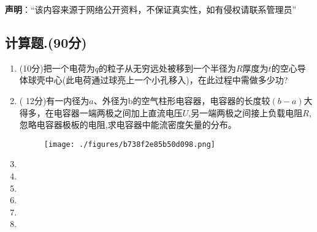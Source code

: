 
\textbf{声明}：“该内容来源于网络公开资料，不保证真实性，如有侵权请联系管理员”

\subsection{计算题.(90分)}
\begin{enumerate}
\item (10分)把一个电荷为$q$的粒子从无穷远处被移到一个半径为$R$厚度为$t$的空心导体球壳中心(此电荷通过球亮上一个小孔移入)，在此过程中需做多少功?
\item ( 12分)有一内径为$a$、外径为b的空气柱形电容器，电容器的长度较$(b-a)$大得多，在电容器一端两极之间加上直流电压$U$,另一端两极之间接上负载电阻$R$,忽略电容器极板的电阻,求电容器中能流密度矢量的分布。
\begin{figure}[ht]
\centering
\texttt{[image: ./figures/b738f2e85b50d098.png]}
\caption{} \label{fig_CD08_1}
\end{figure}
\item 
\item 
\item 
\item 
\item 
\item 

\end{enumerate}